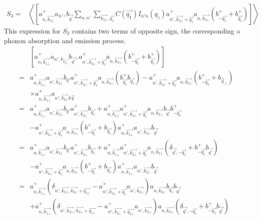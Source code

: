 \documentclass{article}
\begin{document}
\begin{align*}
        S_3 = & \left \langle \left[a^+_{n,\vec{k_{1\bot}}}a_{n'},b_{\vec{q'}} \sum_{n,n'}\sum_{\vec{k_{3\bot}},\vec{q_1}}C\left(\vec{q_1}\right)I_{n'n}\left(q_z\right) a^+_{n', \vec{k_{3\bot}}+\vec{q_1}}a_{n, \vec{k_{3\bot}}}\left(b^+_{-\vec{q_1}}+ b^+_{\vec{q_1}}\right)\right] \right \rangle
\end{align*}
This expression for $S_3$ contains two terms of opposite sign, the corresponding o phonon absorption and emission process.
\begin{align*}
    & \left[a^+_{n,\vec{k_{1\bot}}}a_{n',k_{\vec{k_{2\bot}}}}b_{\vec{q'}},a^+_{n', \vec{k_{3\bot}}+ \vec{q_1}} a_{n,\vec{k_{3\bot}}}\left(b^+_{-\vec{q_1}}+ b^+_{\vec{q_1}}\right)\right] \\
     = & a^+_{n, \vec{k_{1\bot}}}a_{n',\vec{k_{2\bot}}}b_{q'}a^+_{n', \vec{k_{3\bot}}+\vec{q_1}}a_{n, \vec{k_{3\bot}}}\left(b^+_{ \vec{q_1}}b_{\vec{q_1}}\right) - a^+_{n', \vec{k_{3\bot}}+ \vec{q_1}}a_{n, \vec{k_{3\bot}}}\left(b^+_{-\vec{q_1}}+ b_{\vec{q}_{\bot}}\right) \\
    & \times a^+_{n, \vec{k_{1\bot}}}a_{n', \vec{k_{2\bot}} k \vec{q}}\\
  = & a^+_{n, \vec{k_{1\bot}}}a_{n',\vec{k_{2\bot}}}b_{q'}a^+_{n', \vec{k_{3\bot}}}b_{\vec{q_1}}+a^+_{n,\vec{k_{1\bot}}}a^+_{n', \vec{k_{3\bot}}+ \vec{q_1}}a_{n,\vec{k_{3\bot}}}b_{\vec{q'}}b^+_{-\vec{q_1}}\\
     & - a^+_{n', \vec{k_{3\bot}} + \vec{q_1}}a_{n,\vec{k_{3\bot}}} \left(b^+_{-\vec{q_1}}+b_{\vec{q_1}}\right) a^+_{n, \vec{k_{1\bot}}}a_{n', \vec{k_{2\bot}}}b_{\vec{q'}}\\
     = & a^+_{n, \vec{k_{1\bot}}}a_{n',\vec{k_{2\bot}}}b_{q'}a^+_{n', \vec{k_{3\bot}}}b_{\vec{q_1}}+a^+_{n,\vec{k_{1\bot}}}a^+_{n', \vec{k_{3\bot}}+ \vec{q_1}}a_{n,\vec{k_{3\bot}}}\left(\delta_{\vec{q'},-\vec{q_1}}+b^+_{-\vec{q_1}}b_{\vec{q'}} \right)\\
     & - a^+_{n', \vec{k_{3\bot}} + \vec{q_1}}a_{n, \vec{k_{3\bot}}} \left(b^+_{-\vec{q_1}}+b_{\vec{q_1}}\right) a^+_{n, \vec{k_{1\bot}}}a_{n', \vec{k_{2\bot}}}b_{\vec{q'}}\\
    = & a^+_{n, \vec{k_{1\bot}}} \left(\delta_{n', \vec{k_{2\bot}}, \vec{k_{3\bot}}+ \vec{q_{1\bot}}}-a^+_{n', \vec{k_{3\bot}}+\vec{q_1}}a_{n',\vec{k_{2\bot}}}\right)a_{n, \vec{k_{3\bot}}}b_{\vec{q_1}}b_{\vec{q'}} \\
    & + a^+_{n, \vec{k_{1\bot}}} \left(\delta_{n', \vec{k_{2\bot}}, \vec{k_{3\bot}}+ \vec{q_{1\bot}}}- a^+_{n', \vec{k_{3\bot}}+\vec{q_{1\bot}}}a_{n',\vec{k_{2\bot}}}\right)a_{n, \vec{k_{3\bot}}}\left(\delta_{\vec{q'},-\vec{q_1}}+b^+_{-\vec{q_1}}b_{\vec{q'}}\right) \\

\end{align*}
\end{document}
